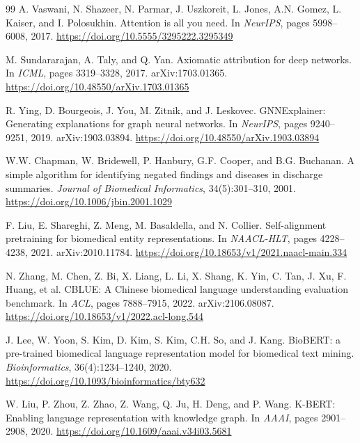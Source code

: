 \documentclass[11pt,onecolumn,a4paper]{article}
\begin{document}
\begin{thebibliography}{99}
A. Vaswani, N. Shazeer, N. Parmar, J. Uszkoreit, L. Jones, A.N. Gomez, L. Kaiser, and I. Polosukhin.
\newblock Attention is all you need.
\newblock In \textit{NeurIPS}, pages 5998--6008, 2017.
\newblock \url{https://doi.org/10.5555/3295222.3295349}

M. Sundararajan, A. Taly, and Q. Yan.
\newblock Axiomatic attribution for deep networks.
\newblock In \textit{ICML}, pages 3319--3328, 2017. arXiv:1703.01365.
\newblock \url{https://doi.org/10.48550/arXiv.1703.01365}

R. Ying, D. Bourgeois, J. You, M. Zitnik, and J. Leskovec.
\newblock GNNExplainer: Generating explanations for graph neural networks.
\newblock In \textit{NeurIPS}, pages 9240--9251, 2019. arXiv:1903.03894.
\newblock \url{https://doi.org/10.48550/arXiv.1903.03894}

W.W. Chapman, W. Bridewell, P. Hanbury, G.F. Cooper, and B.G. Buchanan.
\newblock A simple algorithm for identifying negated findings and diseases in discharge summaries.
\newblock \textit{Journal of Biomedical Informatics}, 34(5):301--310, 2001.
\newblock \url{https://doi.org/10.1006/jbin.2001.1029}

F. Liu, E. Shareghi, Z. Meng, M. Basaldella, and N. Collier.
\newblock Self-alignment pretraining for biomedical entity representations.
\newblock In \textit{NAACL-HLT}, pages 4228--4238, 2021. arXiv:2010.11784.
\newblock \url{https://doi.org/10.18653/v1/2021.naacl-main.334}

N. Zhang, M. Chen, Z. Bi, X. Liang, L. Li, X. Shang, K. Yin, C. Tan, J. Xu, F. Huang, et al.
\newblock CBLUE: A Chinese biomedical language understanding evaluation benchmark.
\newblock In \textit{ACL}, pages 7888--7915, 2022. arXiv:2106.08087.
\newblock \url{https://doi.org/10.18653/v1/2022.acl-long.544}

J. Lee, W. Yoon, S. Kim, D. Kim, S. Kim, C.H. So, and J. Kang.
\newblock BioBERT: a pre-trained biomedical language representation model for biomedical text mining.
\newblock \textit{Bioinformatics}, 36(4):1234--1240, 2020.
\newblock \url{https://doi.org/10.1093/bioinformatics/bty632}

W. Liu, P. Zhou, Z. Zhao, Z. Wang, Q. Ju, H. Deng, and P. Wang.
\newblock K-BERT: Enabling language representation with knowledge graph.
\newblock In \textit{AAAI}, pages 2901--2908, 2020.
\newblock \url{https://doi.org/10.1609/aaai.v34i03.5681}


\end{thebibliography}
\end{document}
